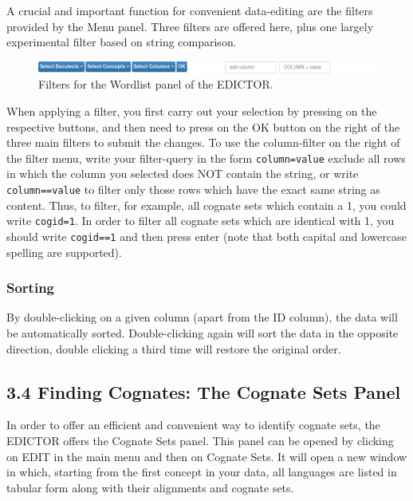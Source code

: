 \documentclass[a4paper,svgnames]{scrartcl}
\begin{document}
A crucial and important function for convenient data-editing are the
filters provided by the Menu panel. Three filters are offered here, plus
one largely experimental filter based on string comparison.

\begin{figure}
\centering
\includegraphics{images/figure-7.png}
\caption{Filters for the Wordlist panel of the EDICTOR.}
\end{figure}

When applying a filter, you first carry out your selection by pressing
on the respective buttons, and then need to press on the OK button on
the right of the three main filters to submit the changes. To use the
column-filter on the right of the filter menu, write your filter-query
in the form \texttt{column=value} exclude all rows in which the column
you selected does NOT contain the string, or write
\texttt{column==value} to filter only those rows which have the exact
same string as content. Thus, to filter, for example, all cognate sets
which contain a 1, you could write \texttt{cogid=1}. In order to filter
all cognate sets which are identical with 1, you should write
\texttt{cogid==1} and then press enter (note that both capital and
lowercase spelling are supported).

\subsubsection*{Sorting}\label{sorting}

By double-clicking on a given column (apart from the ID column), the
data will be automatically sorted. Double-clicking again will sort the
data in the opposite direction, double clicking a third time will
restore the original order.

\subsection*{3.4 Finding Cognates: The Cognate Sets
Panel}\label{finding-cognates-the-cognate-sets-panel}

In order to offer an efficient and convenient way to identify cognate
sets, the EDICTOR offers the Cognate Sets panel. This panel can be
opened by clicking on EDIT in the main menu and then on Cognate Sets. It
will open a new window in which, starting from the first concept in your
data, all languages are listed in tabular form along with their
alignments and cognate sets.
\end{document}
